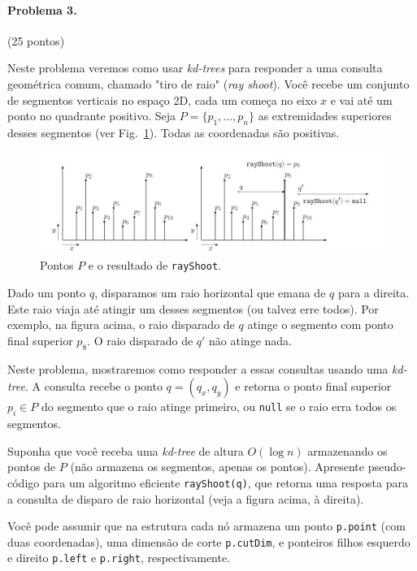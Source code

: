\documentclass{article}
\begin{document}
\paragraph{Problema 3.} (25 pontos) 

Neste problema veremos como usar \textit{kd-trees} para responder a uma consulta geométrica comum, chamado "tiro de raio" (\textit{ray shoot}). Você recebe um conjunto de segmentos verticais no espaço 2D, cada um
começa no eixo $x$ e vai até um ponto no quadrante positivo. Seja $P = \{p_1, . . . , p_n\}$ as extremidades superiores desses segmentos (ver Fig.~\ref{fig:prob3}). Todas as coordenadas são positivas.

\begin{figure}[h]
    \centering
    \includegraphics[width = 0.8\linewidth]{figs/fig3.jpeg}
    \caption{Pontos $P$ e o resultado de \texttt{rayShoot}.}
    \label{fig:prob3}
\end{figure}

Dado um ponto $q$, disparamos um raio horizontal que emana de $q$ para a direita. Este raio viaja
até atingir um desses segmentos (ou talvez erre todos). Por exemplo, na figura
acima, o raio disparado de $q$ atinge o segmento com ponto final superior $p_8$. O raio disparado de $q'$ não atinge nada.

Neste problema, mostraremos como responder a essas consultas usando uma \textit{kd-tree}. A consulta recebe o ponto $q = (q_x, q_y)$ e retorna o ponto final superior
$p_i \in P$ do segmento que o raio atinge primeiro, ou \texttt{null} se o raio erra todos os segmentos. 

Suponha que você receba uma \textit{kd-tree} de altura $O(\log n)$ armazenando os pontos de $P$ (não armazena os segmentos, apenas os pontos). Apresente pseudo-código para um algoritmo eficiente \texttt{rayShoot(q)},
que retorna uma resposta para a consulta de disparo de raio horizontal (veja a figura acima, à direita).

Você pode assumir que na estrutura cada nó armazena um ponto \texttt{p.point} (com duas coordenadas),
uma dimensão de corte \texttt{p.cutDim}, e ponteiros filhos esquerdo e direito \texttt{p.left} e \texttt{p.right}, respectivamente.
\end{document}
